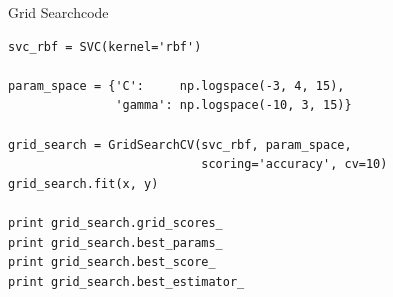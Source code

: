 \documentclass[xcolor=dvipsnames]{beamer}
\begin{document}
\begin{frame}[fragile]{Grid Search}{code}
    \begin{verbatim}
svc_rbf = SVC(kernel='rbf')

param_space = {'C':     np.logspace(-3, 4, 15),
               'gamma': np.logspace(-10, 3, 15)}

grid_search = GridSearchCV(svc_rbf, param_space,
                           scoring='accuracy', cv=10)
grid_search.fit(x, y)

print grid_search.grid_scores_
print grid_search.best_params_
print grid_search.best_score_
print grid_search.best_estimator_
    \end{verbatim}
\end{frame}
\end{document}
